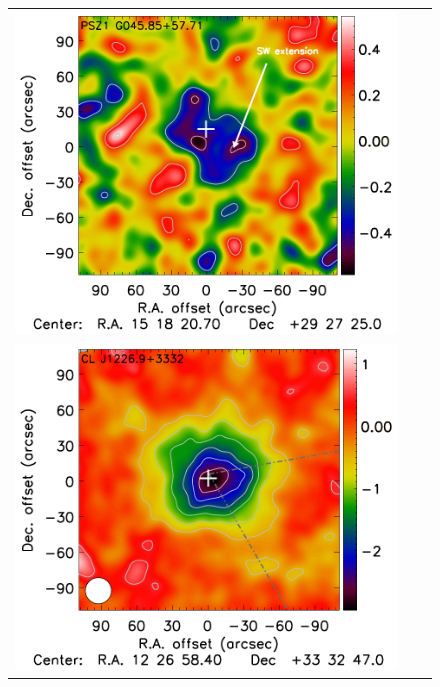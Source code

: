 \documentclass[traditabstract]{aa}
\begin{document}
\begin{figure}[p]
{\begin{tabular}{lll}
\includegraphics[trim=2.3cm 2.2cm 0cm 0cm, clip=true, scale=1]{Figure/DoG_PSZ1G045_15_15_45.pdf} \\
\includegraphics[trim=0cm 0.7cm 0cm 0cm, clip=true, scale=1]{Figure/Map_CLJ1227.pdf} & 

\end{tabular}}
\end{figure}
\end{document}

